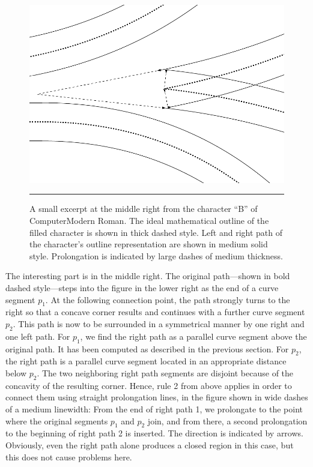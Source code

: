 \begin{figure}[t]
\centerline{\includegraphics[scale=1.1]{t1dump/t1dump_B}}
\vskip3mm\hrule\vskip3mm\small
\caption{\label{figure:stroking4}A small excerpt at the middle right from the
  character ``B'' of ComputerModern Roman. The ideal mathematical outline of
  the filled character is shown in thick dashed style. Left and right path of
  the character's outline representation are shown in medium solid
  style. Prolongation is indicated by large dashes of medium thickness.}
\end{figure}
The interesting part is in the middle right. The original path---shown in bold
dashed style---steps into the figure in the lower right as the end of a curve
segment $p_1$. At the following connection point, the path strongly turns to
the right so that a concave corner results and continues with a further curve
segment $p_2$. This path is now to be surrounded in a symmetrical manner by
one right and one left path. For $p_1$, we find the right path as a parallel
curve segment above the original path. It has been computed as described in
the previous section. For $p_2$, the right path is a parallel curve segment
located in an appropriate distance below $p_2$. The two neighboring right path
segments are disjoint because of the concavity of the resulting corner. Hence,
rule 2 from above applies in order to connect them using straight prolongation
lines, in the figure shown in wide dashes of a medium linewidth: From the end
of right path 1, we prolongate to the point where the original segments $p_1$ and
$p_2$ join, and from there, a second prolongation to the beginning of right
path 2 is inserted. The direction is indicated by arrows. Obviously, even the
right path alone produces a closed region in this case, but this does not
cause problems here.

